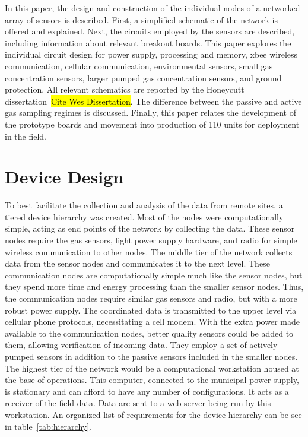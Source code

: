 \documentclass[numbook, envcountsect, envcountsame, envcountreset, runningheads, twocolumn]{svjour3}
\begin{document}
			In this paper, the design and construction of the individual nodes of a networked array of sensors is described.  First, a simplified schematic of the network is offered and explained.  Next, the circuits employed by the sensors are described, including information about relevant breakout boards.  This paper explores the individual circuit design for power supply, processing and memory, xbee wireless communication, cellular communication, environmental sensors, small gas concentration sensors, larger pumped gas concentration sensors, and ground protection.  All relevant schematics are reported by the Honeycutt dissertation~\hl{Cite Wes Dissertation}.  The difference between the passive and active gas sampling regimes is discussed.  Finally, this paper relates the development of the prototype boards and movement into production of 110 units for deployment in the field.
		
		
	\section{Device Design}
		
		To best facilitate the collection and analysis of the data from remote sites, a tiered device hierarchy was created.  Most of the nodes were computationally simple, acting as end points of the network by collecting the data.  These sensor nodes require the gas sensors, light power supply hardware, and radio for simple wireless communication to other nodes.  The middle tier of the network collects data from the sensor nodes and communicates it to the next level.  These communication nodes are computationally simple much like the sensor nodes, but they spend more time and energy processing than the smaller sensor nodes.  Thus, the communication nodes require similar gas sensors and radio, but with a more robust power supply.  The coordinated data is transmitted to the upper level via cellular phone protocols, necessitating a cell modem.  With the extra power made available to the communication nodes, better quality sensors could be added to them, allowing verification of incoming data.  They employ a set of actively pumped sensors in addition to the passive sensors included in the smaller nodes.  The highest tier of the network would be a computational workstation housed at the base of operations.  This computer, connected to the municipal power supply, is stationary and can afford to have any number of configurations.  It acts as a receiver of the field data.  Data are sent to a web server being run by this workstation.  An organized list of requirements for the device hierarchy can be see in table~\ref{tab:hierarchy}.
		
\end{document}
